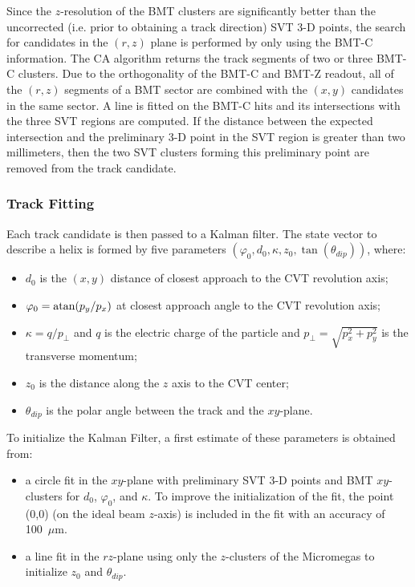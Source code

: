 Since the $z$-resolution of the BMT clusters are significantly better than the uncorrected (i.e. prior to obtaining a track direction)  SVT 3-D points, the search for candidates in the $(r,z)$ plane is
performed by only using the BMT-C information. The CA algorithm returns the track segments of two
or three BMT-C clusters. Due to the orthogonality of the BMT-C and BMT-Z readout, all of the $(r,z)$ segments of
a BMT sector are combined with the $(x,y)$ candidates in the same sector. A line is fitted on the BMT-C hits and
its intersections with the three SVT regions are computed. If the distance between the expected intersection and
the preliminary 3-D point in the SVT region is greater than two millimeters, then the two SVT clusters forming this
preliminary point are removed from the track candidate.

\subsubsection{Track Fitting}

Each track candidate is then passed to a Kalman filter. The state vector to describe a helix is formed by five
parameters $(\varphi_0, d_0, \kappa, z_0, \tan(\theta_{dip}))$, where:

\begin{itemize}
\item $d_0$ is the $(x,y)$ distance of closest approach to the CVT revolution axis;
\item $\varphi_0 = {\rm atan}(p_y/p_x)$ at closest approach angle to the CVT revolution axis;
\item $\kappa=q/p_\perp$ and $q$ is the electric charge of the particle and $p_\perp=\sqrt{p_x^2+p_y^2}$ is
  the transverse momentum;
\item $z_0$ is the distance along the $z$ axis to the CVT center;
\item $\theta_{dip}$ is the polar angle between the track and the $xy$-plane.
\end{itemize}

To initialize the Kalman Filter, a first estimate of these parameters is obtained from:

\begin{itemize}
\item a circle fit in the $xy$-plane with preliminary SVT 3-D points and BMT $xy$-clusters for $d_0$,
  $\varphi_0$, and $\kappa$. To improve the initialization of the fit, the point (0,0) (on the ideal beam $z$-axis)
  is included in the fit with an accuracy of 100~$\mu$m.
\item a line fit in the $rz$-plane using only the $z$-clusters of the Micromegas to initialize $z_0$ and $\theta_{dip}$.
\end{itemize}

